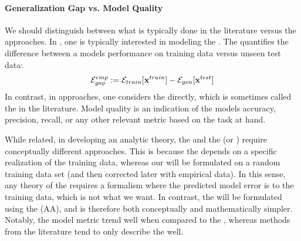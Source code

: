 \paragraph{Generalization Gap vs. Model Quality}
\label{sxn:SMOG_main-model_quality}

We should distinguish between what is typically done in the \SLT literature versus the \STATMECH approaches.
In \SLT, one is typically interested in modeling the \emph{\GeneralizationGap}.
The \GeneralizationGap quantifies the difference between a models performance on training data versus unseen test data:
\begin{align}
  \label{eqn:gen_gap}
  \mathcal{E}^{emp}_{gap}:= {\mathcal{E}}_{train}[\mathbf{x}^{train}]- {\mathcal{E}}_{gen}[\mathbf{x}^{test}]
\end{align}
In contrast, in \STATMECH approaches, one considers the \ModelGeneralizationError directly,
which is sometimes called the \ModelQuality in the \SLT literature.
Model quality is an indication of the models accuracy, precision, recall, or any other relevant metric based on the task at hand.

While related, in developing an analytic theory, the \GeneralizationGap and
the \ModelQuality (or \ModelGeneralizationError) require conceptually different approaches.
This is because the  \GeneralizationGap depends on a specific realization of the training data,
whereas our \ModelGeneralizationError will be formulated on a random training data set
(and then corrected later with empirical data).
In this sense, any theory of the \GeneralizationGap  requires a formalism where the
predicted model error is \Quenched to the training data, which is not what we want.
In contrast, the \ModelGeneralizationError  will be formulated using the \AnnealedApproximation (AA),
and is therefore both conceptually and mathematically simpler.
Notably, the \HTSR model \Quality metric trend well when compared to the  \ModelGeneralizationError ,
whereas methods from the \SLT literature tend to only describe the \GeneralizationGap  well.\cite{YTHx23_KDD}
